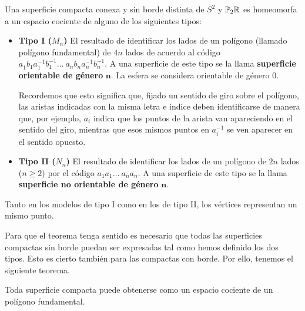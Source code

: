 \documentclass[GTSResumen.tex]{subfiles}
\begin{document}
\begin{teorema}
Una superficie compacta conexa y sin borde distinta de $S^2$ y $\mathbb{P}_2\mathbb{R}$ es homeomorfa a un espacio cociente de alguno de los siguientes tipos:
\begin{itemize}
\item \textbf{Tipo I ($M_n$)}
El resultado de identificar los lados de un polígono (llamado polígono fundamental) de $4n$ lados de acuerdo al código $a^{}_1 b^{}_1 a^{-1}_1 b^{-1}_1\dots\ a^{}_n b^{}_n a_n^{-1} b_n^{-1}$. A una superficie de este tipo se la llama \textbf{superficie orientable de género} $\mathbf{n}$. La esfera se considera orientable de género $0$.

Recordemos que esto significa que, fijado un sentido de giro sobre el polígono, las aristas indicadas con la misma letra e índice deben identificarse de manera que, por ejemplo,  $a_i$ indica que los puntos de la arista van apareciendo en el sentido del giro, mientras que esos mismos puntos en  $a_i^{-1}$ se ven aparecer  en el sentido opuesto.


\item \textbf{Tipo II ($N_n$)}
El resultado de identificar los lados de un polígono de $2n$ lados ($n\geq 2$) por el código $a_1 a_1 \dots\ a_n a_n$. A una superficie de este tipo se la llama \textbf{superficie no orientable de género} $\mathbf{n}$.

\end{itemize}
\end{teorema}



\begin{observacion} Tanto en los modelos de tipo I como en los de tipo II, los vértices representan un mismo punto.


\end{observacion}

Para que el teorema tenga sentido es necesario que todas las superficies compactas sin borde puedan ser expresadas tal como hemos definido los dos tipos. Esto es cierto también para las compactas con borde. Por ello, tenemos el siguiente teorema.

\begin{teorema} Toda superficie compacta puede obtenerse  como un espacio cociente de un polígono fundamental.
\end{teorema}
\end{document}
